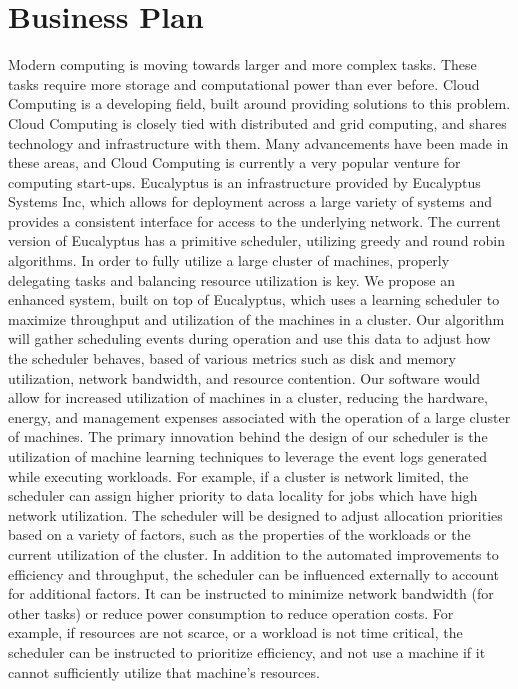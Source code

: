 \section{Business Plan}
  Modern computing is moving towards larger and more complex tasks.  These tasks require more storage and computational power than ever before.  Cloud Computing is a developing field, built around providing solutions to this problem.  Cloud Computing is closely tied with distributed and grid computing, and shares technology and infrastructure with them.  Many advancements have been made in these areas, and Cloud Computing is currently a very popular venture for computing start-ups.  
  Eucalyptus is an infrastructure provided by Eucalyptus Systems Inc, which allows for deployment across a large variety of systems and provides a consistent interface for access to the underlying network.  The current version of Eucalyptus has a primitive scheduler, utilizing greedy and round robin algorithms.  In order to fully utilize a large cluster of machines, properly delegating tasks and balancing resource utilization is key.  
  We propose an enhanced system, built on top of Eucalyptus, which uses a learning scheduler to maximize throughput and utilization of the machines in a cluster.  Our algorithm will gather scheduling events during operation and use this data to adjust how the scheduler behaves, based of various metrics such as disk and memory utilization, network bandwidth, and resource contention.  Our software would allow for increased utilization of machines in a cluster, reducing the hardware, energy, and management expenses associated with the operation of a large cluster of machines.
  The primary innovation behind the design of our scheduler is the utilization of machine learning techniques to leverage the event logs generated while executing workloads.  For example, if a cluster is network limited, the scheduler can assign higher priority to data locality for jobs which have high network utilization.  The scheduler will be designed to adjust allocation priorities based on a variety of factors, such as the properties of the workloads or the current utilization of the cluster.
  In addition to the automated improvements to efficiency and throughput, the scheduler can be influenced externally to account for additional factors.  It can be instructed to minimize network bandwidth (for other tasks) or reduce power consumption to reduce operation costs.  For example, if resources are not scarce, or a workload is not time critical, the scheduler can be instructed to prioritize efficiency, and not use a machine if it cannot sufficiently utilize that machine's resources.  
  